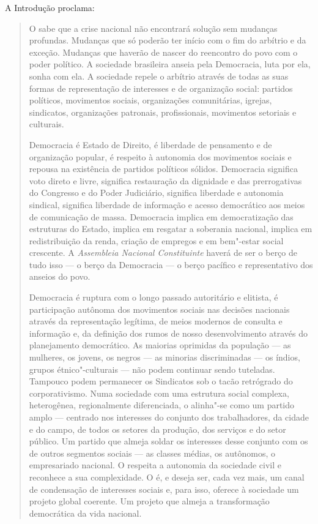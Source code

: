 A Introdução proclama: 

\begin{quote}
O  sabe que a crise nacional não encontrará solução sem
mudanças profundas. Mudanças que só poderão ter início com o fim do
arbítrio e da exceção. Mudanças que haverão de nascer do reencontro do
povo com o poder político. A sociedade brasileira anseia pela Democracia, luta por ela, sonha com
ela. A sociedade repele o arbítrio através de todas as suas formas de
representação de interesses e de organização social: partidos políticos,
movimentos sociais, organizações comunitárias, igrejas, sindicatos,
organizações patronais, profissionais, movimentos setoriais e culturais.

Democracia é Estado de Direito, é liberdade de pensamento e de
organização popular, é respeito à autonomia dos movimentos sociais e
repousa na existência de partidos políticos sólidos. Democracia
significa voto direto e livre, significa restauração da dignidade e das
prerrogativas do Congresso e do Poder Judiciário, significa liberdade e
autonomia sindical, significa liberdade de informação e acesso
democrático aos meios de comunicação de massa. Democracia implica em
democratização das estruturas do Estado, implica em resgatar a soberania
nacional, implica em redistribuição da renda, criação de empregos e em
bem"-estar social crescente. A \emph{Assembleia Nacional
Constituinte} haverá de ser o berço de tudo
isso --- o berço da Democracia --- o berço pacífico e representativo dos
anseios do povo.

Democracia é ruptura com o longo passado autoritário e
elitista, é participação autônoma dos movimentos sociais nas decisões
nacionais através da representação legítima, de meios modernos de
consulta e informação e, da definição dos rumos de nosso desenvolvimento
através do planejamento democrático. As maiorias oprimidas da população --- as mulheres, os jovens, os negros
--- as minorias discriminadas --- os índios, grupos étnico"-culturais
--- não podem continuar sendo tuteladas.
Tampouco podem permanecer os Sindicatos sob o tacão retrógrado do
corporativismo. Numa sociedade com uma estrutura social complexa,
heterogênea, regionalmente diferenciada, o  alinha"-se como um
partido amplo --- centrado nos interesses do conjunto dos trabalhadores,
da cidade e do campo, de todos os setores da produção, dos serviços e do
setor público. Um partido que almeja soldar os interesses desse conjunto com os de
outros segmentos sociais --- as classes médias, os autônomos, o
empresariado nacional. O  respeita a autonomia da sociedade civil e
reconhece a sua complexidade. O  é, e deseja ser, cada vez mais, um
canal de condensação de interesses sociais e, para isso, oferece à
sociedade um projeto global coerente. Um projeto que almeja a
transformação democrática da vida nacional.


\end{quote}
